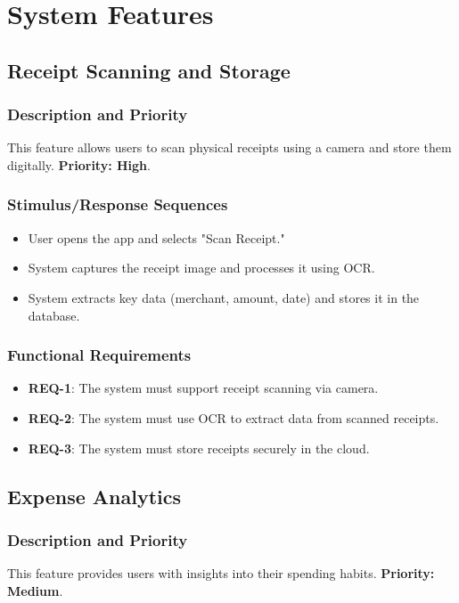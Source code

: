 \documentclass[12pt]{article}
\begin{document}
\section{System Features}
\subsection{Receipt Scanning and Storage}
\subsubsection{Description and Priority}
This feature allows users to scan physical receipts using a camera and store them digitally. \textbf{Priority: High}.

\subsubsection{Stimulus/Response Sequences}
\begin{itemize}
    \item User opens the app and selects "Scan Receipt."
    \item System captures the receipt image and processes it using OCR.
    \item System extracts key data (merchant, amount, date) and stores it in the database.
\end{itemize}

\subsubsection{Functional Requirements}
\begin{itemize}
    \item \textbf{REQ-1}: The system must support receipt scanning via camera.
    \item \textbf{REQ-2}: The system must use OCR to extract data from scanned receipts.
    \item \textbf{REQ-3}: The system must store receipts securely in the cloud.
\end{itemize}

\subsection{Expense Analytics}
\subsubsection{Description and Priority}
This feature provides users with insights into their spending habits. \textbf{Priority: Medium}.
\end{document}
